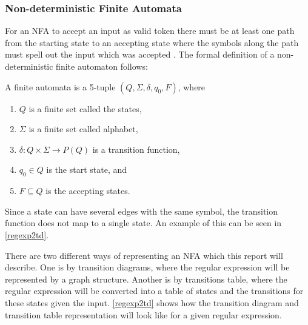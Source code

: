 \subsubsection{Non-deterministic Finite Automata}
For an NFA to accept an input as valid token there must be at least one path
from the starting state to an accepting state where the symbols along
the path must spell out the input which was accepted \cite{Aho2006}.
The formal definition of a non-deterministic finite automaton follows:
\begin{definition} \label{finiteAutomataDef}
A finite automata is a 5-tuple $(Q, \Sigma, \delta, q_0, F)$, where
\begin{enumerate}
  \item $Q$ is a finite set called the states,
  \item $\Sigma$ is a finite set called alphabet,
  \item $\delta: Q \times \Sigma \to P(Q)$ is a transition function,
  \item $q_0 \in Q$ is the start state, and
  \item $F \subseteq Q$ is the accepting states.
\end{enumerate} 
\end{definition}

Since a state can have several edges with the same symbol, the transition
function does not map to a single state. An example of this can be seen in
\cref{regexp2td}.

There are two different ways of representing an NFA which this report will
describe. One is by transition diagrams, where the regular expression will be
represented by a graph structure. Another is by transitions table, where the 
regular expression will be converted into a table of states and the 
transitions for these states given the input. \cref{regexp2td} shows how 
the transition diagram and transition table representation will look like for a 
given regular expression.

